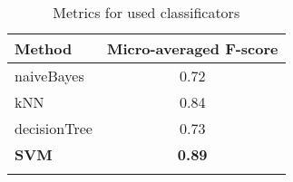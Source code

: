 \begin{table}[h!]
    \caption{Metrics for used classificators}
    \begin{center}
        \begin{tabular}{lc}
            \toprule
            \textbf{Method} & \textbf{Micro-averaged F-score} \\
            \midrule
            naiveBayes & 0.72 \\
            kNN & 0.84 \\
            decisionTree & 0.73 \\
            \textbf{SVM} & \textbf{0.89} \\
            \bottomrule
            \label{table:metrics_all}
        \end{tabular}
    \end{center}
\end{table}
